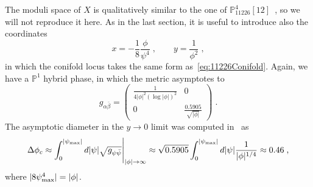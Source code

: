 \documentclass[11pt,a4paper]{article}
\numberwithin{equation}{section}
\numberwithin{table}{section}\setlength{\multlinegap}{25pt}
\begin{document}
The moduli space of $X$ is qualitatively similar to the one of $\mathbb{P}^4_{11226}[12]$~\cite{Candelas:1993dm,Blumenhagen:2018nts}, so we will not reproduce it here. As in the last section, it is useful to introduce also the coordinates
\begin{equation}
    \label{eq:11222SWCoordinates}
    x=-\frac{1}{8}\frac{\phi}{\psi^4}\;,\qquad y=\frac{1}{\phi^2}\;,
\end{equation}
in which the conifold locus takes the same form as~\eqref{eq:11226Conifold}. Again, we have a $\mathbb{P}^1$ hybrid phase, in which the metric asymptotes to
\begin{equation}
    \label{eq:11222MetricP1Phase}
    g_{\alpha\bar{\beta}}=
    \begin{pmatrix}
        \frac{1}{4|\phi|^2(\log|\phi|)^2} & 0\\
        0 & \frac{0.5905}{\sqrt{|\phi|}}
    \end{pmatrix}\;.
\end{equation}
The asymptotic diameter in the $y\to 0$ limit was computed in~\cite{Blumenhagen:2018nts} as
\begin{equation}
    \label{eq:11222FiniteDistanceApprox}
    \Delta\phi_c\approx
    \int_{0}^{|\psi_\textup{max}|}d|\psi|\sqrt{g_{\psi\bar{\psi}}}\Bigg|_{|\phi|\to\infty}
    \approx \sqrt{0.5905}\int_{0}^{|\psi_\textup{max}|}d|\psi|\frac{1}{|\phi|^{1/4}}
    \approx 0.46\;,
\end{equation}
where $|8\psi_\textup{max}^4|=|\phi|$.
\end{document}
